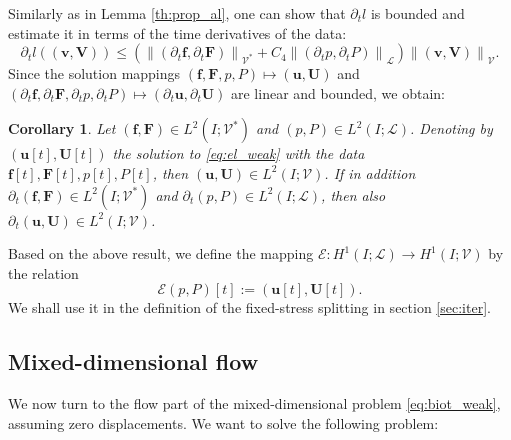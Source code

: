 \documentclass[a4paper]{article}
\newtheorem{corollary}[theorem]{Corollary}
\numberwithin{equation}{section}
\def\dt{\prtl_t}
\def\FF{\vc F}
\def\ff{\vc f}
\def\Hf{\mathscr{L}} %
\def\norm#1{\left\|#1\right\|}
\def\prtl{\partial}
\def\U{\vc U}
\def\uu{\vc u}
\def\V{\vc V}
\def\Vel{{\boldsymbol{\mathcal V}}} %
\def\vc#1{\mathbf{#1}}     %
\def\vv{\vc v}
\newcommand{\eqs}[1]{\begin{equation*}#1\end{equation*}}
\begin{document}
Similarly as in Lemma \ref{th:prop_al}, one can show that $\dt l$ is bounded and estimate it in terms of the time derivatives of the data:
\eqs{ \dt l((\vv,\V)) \le \left(\norm{(\dt\ff,\dt\FF)}_{\Vel^*} + C_4\norm{(\dt p,\dt P)}_\Hf\right)\norm{(\vv,\V)}_\Vel. }
Since the solution mappings $(\ff,\FF,p,P) \mapsto (\uu, \U)$ and $(\dt\ff,\dt\FF,\dt p,\dt P)\mapsto(\dt\uu,\dt\U)$ are linear and bounded, we obtain:
\begin{corollary}
Let $(\ff,\FF)\in L^2( I;\Vel^*)$ and $(p,P)\in L^2( I;\Hf)$.
Denoting by $(\uu[t],\U[t])$ the solution to \eqref{eq:el_weak} with the data $\ff[t],\FF[t],p[t],P[t]$, then $(\uu,\U)\in L^2( I;\Vel)$.
If in addition $\dt(\ff,\FF)\in L^2( I;\Vel^*)$ and $\dt(p,P)\in L^2( I;\Hf)$, then also $\dt(\uu,\U)\in L^2( I;\Vel)$.
\end{corollary}
% 
Based on the above result, we define the mapping $\mathcal E: H^1( I;\Hf)\to H^1( I;\Vel)$ by the relation
\eqs{ \mathcal E(p,P)[t] := (\uu[t],\U[t]). }
We shall use it in the definition of the fixed-stress splitting in section \ref{sec:iter}.


\subsection{Mixed-dimensional flow}\label{sec:wellposedness_flow}

We now turn to the flow part of the mixed-dimensional problem \eqref{eq:biot_weak}, assuming zero displacements.
We want to solve the following problem:
\end{document}
